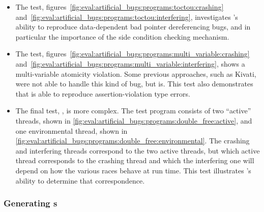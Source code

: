 \begin{itemize}
  \item The  test,
    figures~\ref{fig:eval:artificial_bugs:programs:toctou:crashing}
    and~\ref{fig:eval:artificial_bugs:programs:toctou:interfering},
    investigates {\technique}'s ability to reproduce data-dependent
    bad pointer dereferencing bugs, and in particular the importance
    of the side condition checking mechanism.
  \item The  test,
    figures~\ref{fig:eval:artificial_bugs:programs:multi_variable:crashing}
    and~\ref{fig:eval:artificial_bugs:programs:multi_variable:interfering},
    shows a multi-variable atomicity violation.  Some previous
    approaches, such as Kivati\needCite{}, were not able to handle
    this kind of bug, but {\technique} is.  This test also
    demonstrates that {\technique} is able to reproduce
    assertion-violation type errors.
  \item The final test, , is more complex.  The
    test program consists of two ``active'' threads, shown in
    \autoref{fig:eval:artificial_bugs:programs:double_free:active},
    and one environmental thread, shown in
    \autoref{fig:eval:artificial_bugs:programs:double_free:environmental}.
    The crashing and interfering threads correspond to the two active
    threads, but which active thread corresponds to the crashing
    thread and which the interfering one will depend on how the
    various races behave at run time.  This test illustrates
    {\technique}'s ability to determine that correspondence.
\end{itemize}

\subsubsection{Generating s}


